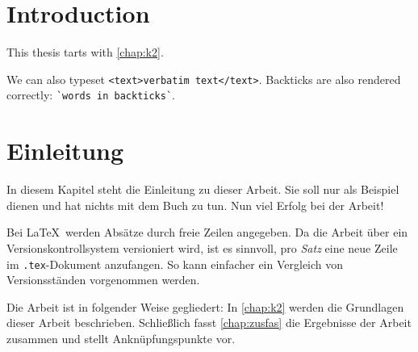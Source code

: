 \ifenglish
    \chapter{Introduction}

    This thesis tarts with \cref{chap:k2}.

    We can also typeset \verb|<text>verbatim text</text>|.
    Backticks are also rendered correctly: \verb|`words in backticks`|.
\fi
\ifdeutsch
    \chapter{Einleitung}
    In diesem Kapitel steht die Einleitung zu dieser Arbeit.
    Sie soll nur als Beispiel dienen und hat nichts mit dem Buch \cite{WSPA} zu tun.
    Nun viel Erfolg bei der Arbeit!

    Bei \LaTeX\ werden Absätze durch freie Zeilen angegeben.
    Da die Arbeit über ein Versionskontrollsystem versioniert wird, ist es sinnvoll, pro \emph{Satz} eine neue Zeile im \texttt{.tex}-Dokument anzufangen.
    So kann einfacher ein Vergleich von Versionsständen vorgenommen werden.

    Die Arbeit ist in folgender Weise gegliedert:
    In \cref{chap:k2} werden die Grundlagen dieser Arbeit beschrieben.
    Schließlich fasst \cref{chap:zusfas} die Ergebnisse der Arbeit zusammen und stellt Anknüpfungspunkte vor.
\fi